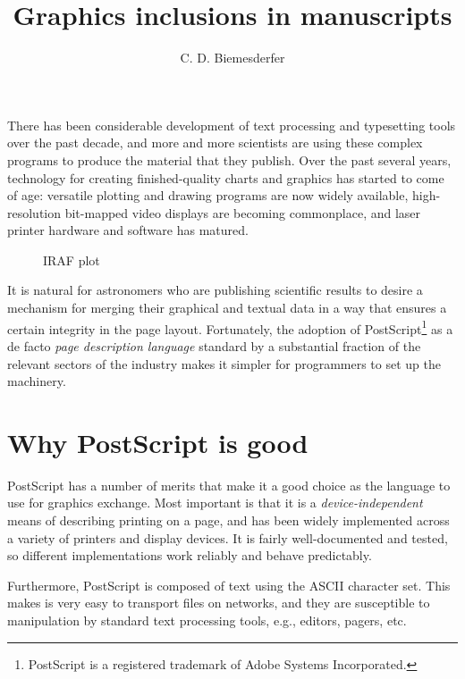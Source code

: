 


\def\emphasize#1{{\sl #1\/}}


\title{Graphics inclusions in manuscripts}
\author{C. D. Biemesderfer}

There has been considerable development of text processing and
typesetting tools over the past decade, and more and more
scientists are using these complex programs to produce the
material that they publish.
Over the past several years, technology for creating
finished-quality charts and graphics has started to come of age:
versatile plotting and drawing programs are now widely available,
high-resolution bit-mapped video displays are becoming commonplace,
and laser printer hardware and software has matured.

\begin{figure}[h]
\caption{IRAF plot} \label{onebarrel}
\end{figure}

It is natural for astronomers who are publishing scientific
results to desire a mechanism for merging their graphical and
textual data in a way that ensures a certain integrity in the
page layout.
Fortunately, the adoption of PostScript\footnote{PostScript
is a registered trademark of Adobe Systems Incorporated.}
as a de facto \emphasize{page description language} standard
by a substantial fraction of the relevant sectors of the
industry makes it simpler for programmers to set up the machinery.

\section{Why PostScript is good}

PostScript has a number of merits that make it a good choice
as the language to use for graphics exchange.
Most important is that it is a \emphasize{device-independent}
means of describing printing on a page, and has been widely
implemented across a variety of printers and display devices.
It is fairly well-documented and tested, so different
implementations work reliably and behave predictably.

Furthermore, PostScript is composed of text using the ASCII
character set.  This makes is very easy to transport files
on networks, and they are susceptible to manipulation by
standard text processing tools, e.g., editors, pagers, etc.

